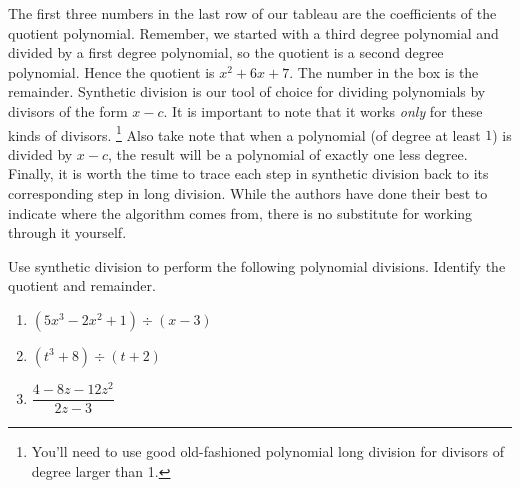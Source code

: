 \documentclass{ximera}
\begin{document}
The first three numbers in the last row of our tableau are the coefficients of the quotient polynomial.  Remember, we started with a third degree polynomial and divided by a first degree polynomial, so the quotient is a second degree polynomial.  Hence the quotient is $x^2+6x+7$.  The number in the box is the remainder.  Synthetic division is our tool of choice for dividing polynomials by divisors of the form $x-c$.  It is important to note that it works \emph{only} for these kinds of divisors.%
\footnote{You'll need to use good old-fashioned polynomial long division for divisors of degree larger than 1.} 
Also take note that when a polynomial (of degree at least $1$) is divided by $x-c$, the result will be a polynomial of exactly one less degree. Finally, it is  worth the time to trace each step in synthetic division back to its corresponding step in long division.  While the authors have done their best to indicate where the algorithm comes from, there is no substitute for working through it yourself.

\begin{example}  
    Use synthetic division to perform the following polynomial divisions.  Identify the quotient and remainder. 
    \begin{multicols}{3}
        \begin{enumerate}
            \item  $\left(5x^3 - 2x^2 + 1\right) \div (x-3)$ 
            \item  $\left(t^3+8\right) \div (t+2)$ 
            \item  $\dfrac{4-8z-12z^2}{2z-3}$
        \end{enumerate}
    \end{multicols}
\end{example}
\end{document}
